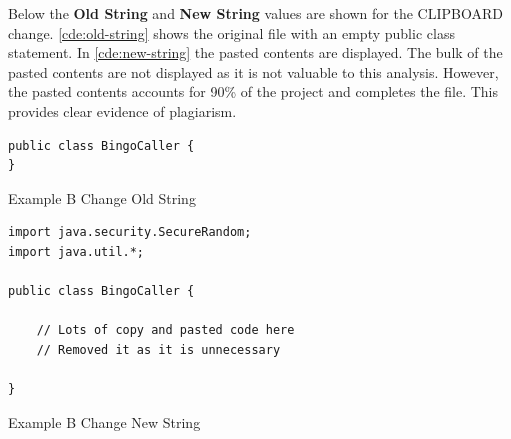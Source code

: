 Below the \textbf{Old String} and \textbf{New String} values are shown for the CLIPBOARD change. \autoref{cde:old-string} shows the original file with an empty public class statement. In \autoref{cde:new-string} the pasted contents are displayed. The bulk of the pasted contents are not displayed as it is not valuable to this analysis. However, the pasted contents accounts for 90\% of the project and completes the file. This provides clear evidence of plagiarism.

\begin{code}
\begin{verbatim}
public class BingoCaller {
}
\end{verbatim}
\caption[Submission Results B Old String]{Example B Change Old String}
\label{cde:old-string}
\end{code}

\begin{code}
\begin{verbatim}
import java.security.SecureRandom;
import java.util.*;

public class BingoCaller {

    // Lots of copy and pasted code here
    // Removed it as it is unnecessary
    
}
\end{verbatim}
\caption[Submission Results B New String]{Example B Change New String}
\label{cde:new-string}
\end{code}
